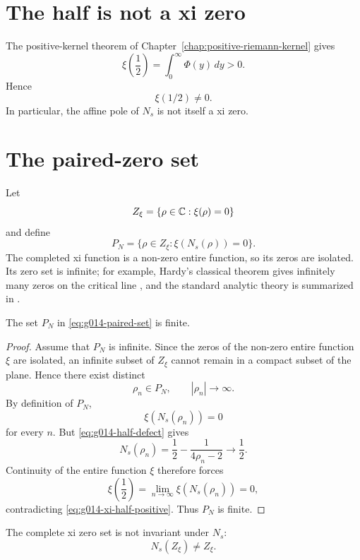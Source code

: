 \section{The half is not a xi zero}

The positive-kernel theorem of Chapter~\ref{chap:positive-riemann-kernel}
gives
\begin{equation}
 \xi\!\left(\frac12\right)
 =\int_0^\infty\Phi(y)\,dy>0.
 \label{eq:g014-xi-half-positive}
\end{equation}
Hence
\[
 \boxed{\xi(1/2)\ne0.}
\]
In particular, the affine pole of $N_s$ is not itself a xi zero.

\section{The paired-zero set}

Let
\[
 Z_\xi=\{\rho\in\mathbb{C}:\xi(\rho)=0\}
\]
and define
\begin{equation}
 P_N
 =\{\rho\in Z_\xi:\xi(N_s(\rho))=0\}.
 \label{eq:g014-paired-set}
\end{equation}
The completed xi function is a non-zero entire function, so its zeros are
isolated.  Its zero set is infinite; for example, Hardy's classical theorem
gives infinitely many zeros on the critical line \citep{hardy1914}, and the
standard analytic theory is summarized in \citep{titchmarsh1986}.

\begin{theorem}
\label{thm:g014-paired-finite}
The set $P_N$ in \cref{eq:g014-paired-set} is finite.
\end{theorem}

\begin{proof}
Assume that $P_N$ is infinite.  Since the zeros of the non-zero entire
function $\xi$ are isolated, an infinite subset of $Z_\xi$ cannot remain in a
compact subset of the plane.  Hence there exist distinct
\[
 \rho_n\in P_N,
 \qquad
 |\rho_n|\to\infty.
\]
By definition of $P_N$,
\[
 \xi(N_s(\rho_n))=0
\]
for every $n$.  But \cref{eq:g014-half-defect} gives
\[
 N_s(\rho_n)
 =\frac12-\frac1{4\rho_n-2}
 \longrightarrow\frac12.
\]
Continuity of the entire function $\xi$ therefore forces
\[
 \xi\!\left(\frac12\right)
 =\lim_{n\to\infty}\xi(N_s(\rho_n))
 =0,
\]
contradicting \cref{eq:g014-xi-half-positive}.  Thus $P_N$ is finite.
\end{proof}

\begin{corollary}
\label{cor:g014-no-global-invariance}
The complete xi zero set is not invariant under $N_s$:
\[
 \boxed{N_s(Z_\xi)\ne Z_\xi.}
\]
\end{corollary}

